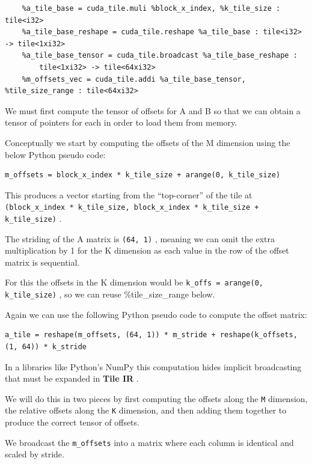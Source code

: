 \documentclass{article}
\begin{document}
\begin{lstlisting}
    %a_tile_base = cuda_tile.muli %block_x_index, %k_tile_size : tile<i32>
    %a_tile_base_reshape = cuda_tile.reshape %a_tile_base : tile<i32> -> tile<1xi32>
    %a_tile_base_tensor = cuda_tile.broadcast %a_tile_base_reshape :
        tile<1xi32> -> tile<64xi32>
    %m_offsets_vec = cuda_tile.addi %a_tile_base_tensor, %tile_size_range : tile<64xi32>
\end{lstlisting}

We must first compute the tensor of offsets for A and B so that we can obtain a tensor of pointers for each in order to load them from memory.


Conceptually we start by computing the offsets of the M dimension using the below Python pseudo code:


\begin{lstlisting}
m_offsets = block_x_index * k_tile_size + arange(0, k_tile_size)
\end{lstlisting}

This produces a vector starting from the ``top-corner'' of the tile at \texttt{(block\_x\_index * k\_tile\_size, block\_x\_index * k\_tile\_size + k\_tile\_size)} .


The striding of the A matrix is \texttt{(64, 1)} , meaning we can omit the extra multiplication by 1 for the K dimension as each value in the row of the offset matrix is sequential.


For this the offsets in the K dimension would be \texttt{k\_offs = arange(0, k\_tile\_size)} , so we can reuse \%tile\_size\_range below.


Again we can use the following Python pseudo code to compute the offset matrix:


\begin{lstlisting}
a_tile = reshape(m_offsets, (64, 1)) * m_stride + reshape(k_offsets, (1, 64)) * k_stride
\end{lstlisting}

In a libraries like Python's NumPy this computation hides implicit broadcasting that must be expanded in \textbf{Tile IR} .


We will do this in two pieces by first computing the offsets along the \texttt{M} dimension, the relative offsets along the \texttt{K} dimension, and then adding them together to produce the correct tensor of offsets.


We broadcast the \texttt{m\_offsets} into a matrix where each column is identical and scaled by stride.
\end{document}
